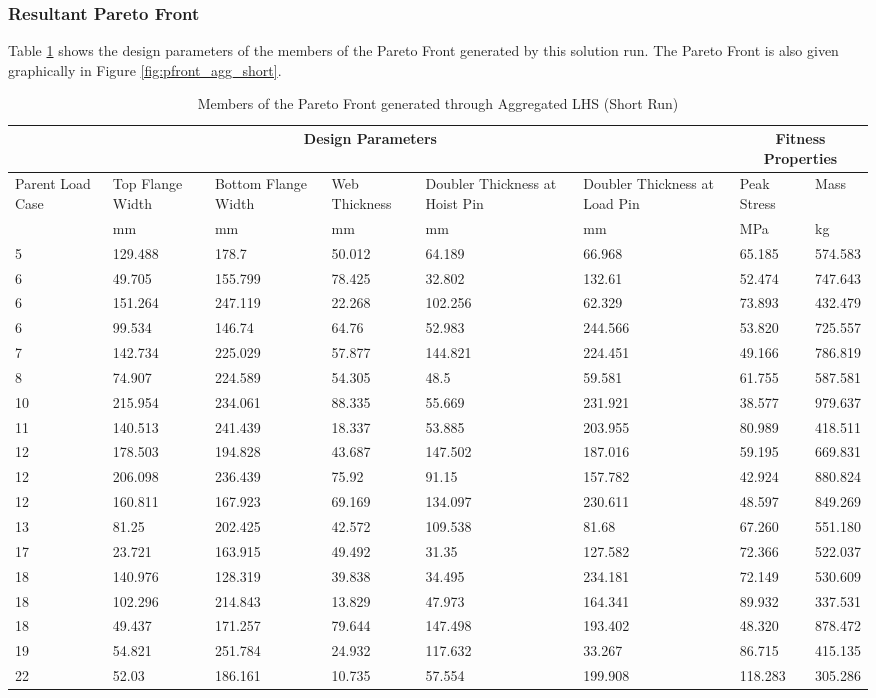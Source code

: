 \subsubsection{Resultant Pareto Front}
Table \ref{tab:pfront_agg_short} shows the design parameters of the members of the Pareto Front generated by this solution run. The Pareto Front is also given graphically in Figure \ref{fig:pfront_agg_short}. 
\begin{table}[!htbp]
\caption{Members of the Pareto Front generated through Aggregated LHS (Short Run)}
\label{tab:pfront_agg_short}
\small
\begin{tabular}{|p{1.5cm}p{1.5cm}p{1.5cm}p{1.4cm}p{2cm}p{2cm}||p{1.5cm}p{1.5cm}|}
\hline
\multicolumn{6}{|c||}{Design Parameters}&\multicolumn{2}{|c|}{Fitness Properties}\\
\hline
Parent Load Case&Top Flange Width&Bottom Flange Width&Web Thickness&Doubler Thickness at Hoist Pin&Doubler Thickness at Load Pin&Peak Stress& Mass\\
\hline
&mm&mm&mm&mm&mm&MPa&kg\\
\hline
5&129.488&178.7&50.012&64.189&66.968&65.185&574.583\\
6&49.705&155.799&78.425&32.802&132.61&52.474&747.643\\
6&151.264&247.119&22.268&102.256&62.329&73.893&432.479\\
6&99.534&146.74&64.76&52.983&244.566&53.820&725.557\\
7&142.734&225.029&57.877&144.821&224.451&49.166&786.819\\
8&74.907&224.589&54.305&48.5&59.581&61.755&587.581\\
10&215.954&234.061&88.335&55.669&231.921&38.577&979.637\\
11&140.513&241.439&18.337&53.885&203.955&80.989&418.511\\
12&178.503&194.828&43.687&147.502&187.016&59.195&669.831\\
12&206.098&236.439&75.92&91.15&157.782&42.924&880.824\\
12&160.811&167.923&69.169&134.097&230.611&48.597&849.269\\
13&81.25&202.425&42.572&109.538&81.68&67.260&551.180\\
17&23.721&163.915&49.492&31.35&127.582&72.366&522.037\\
18&140.976&128.319&39.838&34.495&234.181&72.149&530.609\\
18&102.296&214.843&13.829&47.973&164.341&89.932&337.531\\
18&49.437&171.257&79.644&147.498&193.402&48.320&878.472\\
19&54.821&251.784&24.932&117.632&33.267&86.715&415.135\\
22&52.03&186.161&10.735&57.554&199.908&118.283&305.286\\
\hline
\end{tabular}
\end{table}

